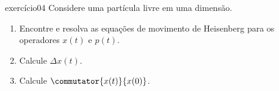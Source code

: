 \begin{exercício}{}{exercício04}
    Considere uma partícula livre em uma dimensão.
    \begin{enumerate}[label=(\alph*)]
        \item Encontre e resolva as equações de movimento de Heisenberg para os operadores \(x(t)\) e \(p(t)\).
        \item Calcule \(\Delta x(t)\).
        \item Calcule \(\commutator{x(t)}{x(0)}\).
    \end{enumerate}
\end{exercício}
